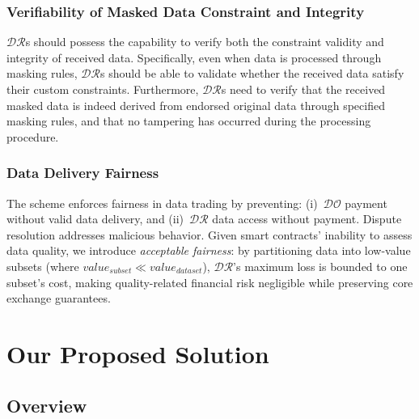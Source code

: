 \documentclass[journal]{IEEEtran}
\begin{document}
\subsubsection{\textbf{Verifiability of Masked Data Constraint and Integrity}} 
$\mathcal{DR}$s should possess the capability to verify both the constraint validity and integrity of received data. Specifically, even when data is processed through masking rules, $\mathcal{DR}$s should be able to validate whether the received data satisfy their custom constraints. Furthermore, $\mathcal{DR}$s need to verify that the received masked data is indeed derived from endorsed original data through specified masking rules, and that no tampering has occurred during the processing procedure.

\subsubsection{\textbf{Data Delivery Fairness}}
The scheme enforces fairness in data trading by preventing: (i)~$\mathcal{DO}$ payment without valid data delivery, and (ii)~$\mathcal{DR}$ data access without payment. Dispute resolution addresses malicious behavior. Given smart contracts' inability to assess data quality, we introduce \emph{acceptable fairness}: by partitioning data into low-value subsets (where $\textit{value}_{subset} \ll \textit{value}_{dataset}$), $\mathcal{DR}$'s maximum loss is bounded to one subset's cost, making quality-related financial risk negligible while preserving core exchange guarantees.

\section{Our Proposed Solution}\label{section:solution}

\subsection{Overview}
\end{document}
